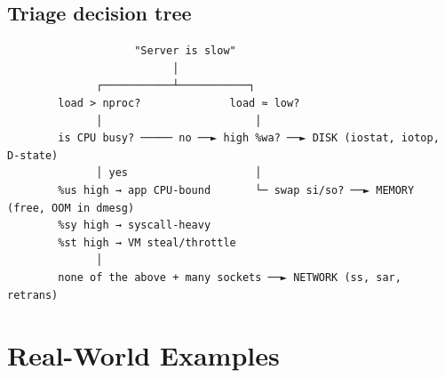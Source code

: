 \documentclass[11pt]{article}
\begin{document}
\subsection{Triage decision tree}\label{triage-decision-tree}

\setcodelang{}

\begin{verbatim}
                    "Server is slow"
                          │
              ┌───────────┴───────────┐
        load > nproc?              load ≈ low?
              │                        │
        is CPU busy? ───── no ──► high %wa? ──► DISK (iostat, iotop, D-state)
              │ yes                    │
        %us high → app CPU-bound       └─ swap si/so? ──► MEMORY (free, OOM in dmesg)
        %sy high → syscall-heavy
        %st high → VM steal/throttle
              │
        none of the above + many sockets ──► NETWORK (ss, sar, retrans)
\end{verbatim}

\section{Real-World Examples}\label{real-world-examples}
\end{document}
